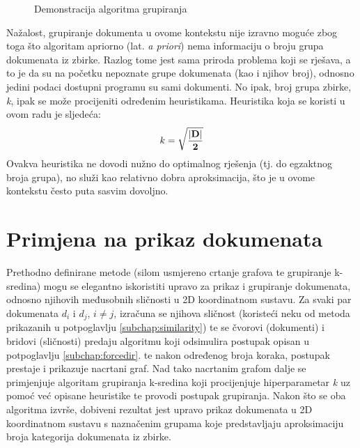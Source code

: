 \documentclass[times, utf8, zavrsni]{fer}
\begin{document}
\begin{figure}
\caption{Demonstracija algoritma grupiranja}
\end{figure}

Nažalost, grupiranje dokumenta u ovome kontekstu nije izravno moguće zbog toga što algoritam apriorno (lat. \textit{a priori}) nema informaciju o broju grupa dokumenata iz zbirke. Razlog tome jest sama priroda problema koji se rješava, a to je da su na početku nepoznate grupe dokumenata (kao i njihov broj), odnosno jedini podaci dostupni programu su sami dokumenti. No ipak, broj grupa zbirke, \textit{k}, ipak se može procijeniti određenim heuristikama. Heuristika koja se koristi u ovom radu je sljedeća:
\begin{equation}
{k}={\mathbf {\sqrt{|D| \over 2}}}
\end{equation}
Ovakva heuristika ne dovodi nužno do optimalnog rješenja (tj. do egzaktnog broja grupa), no služi kao relativno dobra aproksimacija, što je u ovome kontekstu često puta sasvim dovoljno.

\section{Primjena na prikaz dokumenata}
Prethodno definirane metode (silom usmjereno crtanje grafova te grupiranje k-sredina) mogu se elegantno iskoristiti upravo za prikaz i grupiranje dokumenata, odnosno njihovih međusobnih sličnosti u 2D koordinatnom sustavu. Za svaki par dokumenata $d_{i}$ i $d_{j}$, $i \neq j$, izračuna se njihova sličnost (koristeći neku od metoda prikazanih u potpoglavlju \ref{subchap:similarity}) te se čvorovi (dokumenti) i bridovi (sličnosti) predaju algoritmu koji odsimulira postupak opisan u potpoglavlju \ref{subchap:forcedir}. te nakon određenog broja koraka, postupak prestaje i prikazuje nacrtani graf.
Nad tako nacrtanim grafom dalje se primjenjuje algoritam grupiranja k-sredina koji procijenjuje hiperparametar \textit{k} uz pomoć već opisane heuristike te provodi postupak grupiranja. Nakon što se oba algoritma izvrše, dobiveni rezultat jest upravo prikaz dokumenata u 2D koordinatnom sustavu s naznačenim grupama koje predstavljaju aproksimaciju broja kategorija dokumenata iz zbirke.
\end{document}
